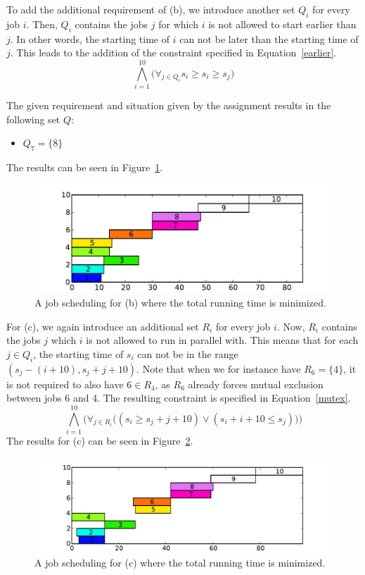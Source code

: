 To add the additional requirement of (b), we introduce another set $Q_i$ for every job $i$. Then, $Q_i$ contains the jobs $j$ for which $i$ is not allowed to start earlier than $j$. In other words, the starting time of $i$ can not be later than the starting time of $j$. This leads to the addition of the constraint specified in Equation~\ref{earlier}.
\begin{equation}
    \label{earlier}
    \bigwedge^{10}_{i=1}\big(\forall_{j\in Q_i} s_i \geq s_i \geq s_j \big)
\end{equation}

The given requirement and situation given by the assignment results in the following set $Q$:
\begin{itemize}
    \item $Q_7 = \{8\}$
\end{itemize}
The results can be seen in Figure~\ref{fig:3b}.
\begin{figure}[H]
    \centering
    \includegraphics[width=\columnwidth]{3/b.pdf}
    \caption{A job scheduling for (b) where the total running time is minimized.}
    \label{fig:3b}
\end{figure}

For (c), we again introduce an additional set $R_i$ for every job $i$. Now, $R_i$ contains the jobs $j$ which $i$ is not allowed to run in parallel with. This means that for each $j \in Q_i$, the starting time of $s_i$ can not be in the range $(s_j - (i + 10), s_j + j + 10)$. Note that when we for instance have $R_6 = \{4\}$, it is not required to also have $6 \in R_4$, as $R_6$ already forces mutual exclusion between jobs 6 and 4. The resulting constraint is specified in Equation~\ref{mutex}.
\begin{equation}
    \label{mutex}
    \bigwedge^{10}_{i=1}\bigg(\forall_{j \in R_i}\big((s_i \geq s_j + j + 10) \vee (s_i + i + 10 \leq s_j)\big)\bigg)
\end{equation}
The results for (c) can be seen in Figure~\ref{fig:3c}.
\begin{figure}[H]
    \centering
    \includegraphics[width=\columnwidth]{3/c.pdf}
    \caption{A job scheduling for (c) where the total running time is minimized.}
    \label{fig:3c}
\end{figure}
